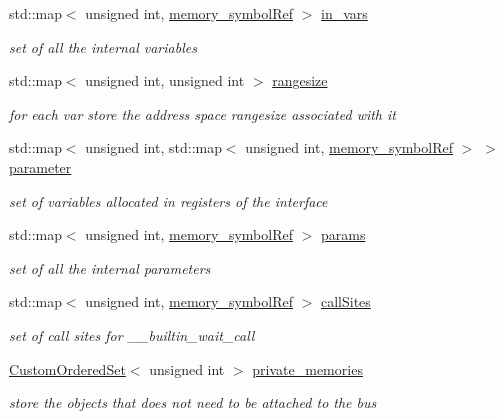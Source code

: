 \begin{DoxyCompactItemize}
std\+::map$<$ unsigned int, \hyperlink{memory__symbol_8hpp_af3608dbc27177447c2d777fa712cc82a}{memory\+\_\+symbol\+Ref} $>$ \hyperlink{classmemory_a7425f19fdc73130bccf232d8deef4006}{in\+\_\+vars}
\begin{DoxyCompactList}\small\item\em set of all the internal variables \end{DoxyCompactList}\item 
std\+::map$<$ unsigned int, unsigned int $>$ \hyperlink{classmemory_a3c2f2a293a39a86fca2072848f852585}{rangesize}
\begin{DoxyCompactList}\small\item\em for each var store the address space rangesize associated with it \end{DoxyCompactList}\item 
std\+::map$<$ unsigned int, std\+::map$<$ unsigned int, \hyperlink{memory__symbol_8hpp_af3608dbc27177447c2d777fa712cc82a}{memory\+\_\+symbol\+Ref} $>$ $>$ \hyperlink{classmemory_a8e55632ecceb2c57fc3a337997528bc1}{parameter}
\begin{DoxyCompactList}\small\item\em set of variables allocated in registers of the interface \end{DoxyCompactList}\item 
std\+::map$<$ unsigned int, \hyperlink{memory__symbol_8hpp_af3608dbc27177447c2d777fa712cc82a}{memory\+\_\+symbol\+Ref} $>$ \hyperlink{classmemory_a8845366310c0ac284b91c2cd561f1ad1}{params}
\begin{DoxyCompactList}\small\item\em set of all the internal parameters \end{DoxyCompactList}\item 
std\+::map$<$ unsigned int, \hyperlink{memory__symbol_8hpp_af3608dbc27177447c2d777fa712cc82a}{memory\+\_\+symbol\+Ref} $>$ \hyperlink{classmemory_ae8e4d74f0178f58f58d3a2e4432c1cd7}{call\+Sites}
\begin{DoxyCompactList}\small\item\em set of call sites for \+\_\+\+\_\+builtin\+\_\+wait\+\_\+call \end{DoxyCompactList}\item 
\hyperlink{classCustomOrderedSet}{Custom\+Ordered\+Set}$<$ unsigned int $>$ \hyperlink{classmemory_a51a28f3d0b125a57a16febef16d93326}{private\+\_\+memories}
\begin{DoxyCompactList}\small\item\em store the objects that does not need to be attached to the bus \end{DoxyCompactList}\item 

\end{DoxyCompactItemize}
